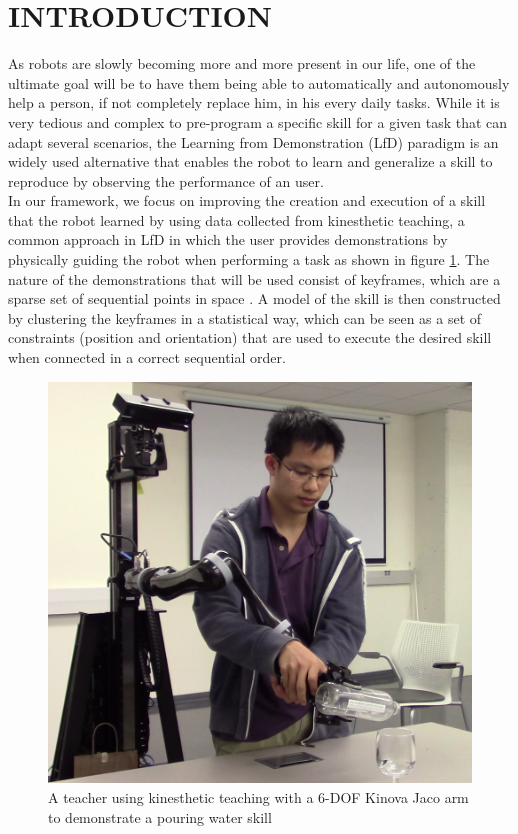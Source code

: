 \documentclass[letterpaper, 10 pt, conference]{ieeeconf}  %
\begin{document}
\section{INTRODUCTION}
As robots are slowly becoming more and more present in our life, one of the ultimate goal will be to have them being able to automatically and autonomously help a person, if not completely replace him, in his every daily tasks.   
While it is very tedious and complex to pre-program a specific skill for a given task that can adapt several scenarios, the Learning from Demonstration (LfD) paradigm is an widely used alternative that enables the robot to learn and generalize a skill to reproduce by observing the performance of an user.\\
In our framework, we focus on improving the creation and execution of a skill that the robot learned by using data collected from kinesthetic teaching, a common approach in LfD in which the user provides demonstrations by physically guiding the robot when performing a task as shown in figure \ref{Pic_kinesthetik_teaching}. The nature of the demonstrations that will be used consist of keyframes, which are a sparse set of sequential points in space\cite{refKeyframe1} \cite{refKeyframe2}\cite{refKeyframe0}.
A model of the skill is then constructed by clustering the keyframes in a statistical way, which can be seen as a set of constraints (position and orientation) that are used to execute the desired skill when connected in a correct sequential order. \\

\begin{figure}[ht]
	\centering
	\includegraphics[scale=0.2]{figure/kinesthetic_teaching.png}
	\caption{A teacher using kinesthetic teaching with a 6-DOF Kinova Jaco arm to demonstrate a pouring water skill}
	\label{Pic_kinesthetik_teaching}
\end{figure}
\end{document}
